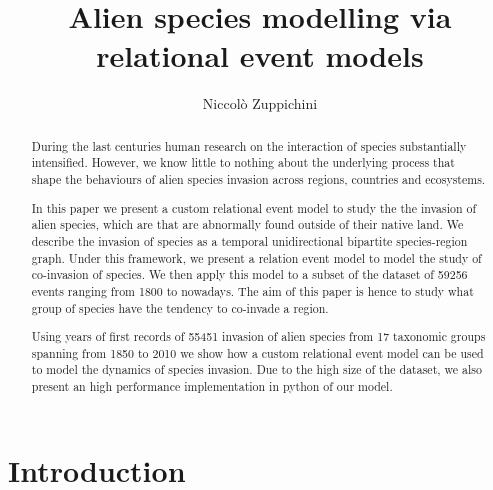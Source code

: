\documentclass[mscthesis]{usiinfthesis}
\title{Alien species modelling via relational event models} %
\author{Niccol\`o Zuppichini} %
\newcommand\numberevents{59256 }
\begin{document}
\maketitle %

\frontmatter %

\begin{abstract}
During the last centuries human research on the interaction of species substantially intensified. However, we know little to nothing about the underlying process that shape the behaviours of alien species invasion across regions, countries and ecosystems.

In this paper we present a custom relational event model to study the the invasion of alien species, which are that are abnormally found outside of their native land. We describe the invasion of species as a temporal unidirectional bipartite species-region graph. Under this framework, we present a relation event model to model the study of co-invasion of species. We then apply this model to a subset of the dataset of \numberevents events ranging from 1800 to nowadays. The aim of this paper is hence to study what group of species have the tendency to co-invade a region.

Using years of first records of 55451 invasion of alien species from 17 taxonomic groups spanning from 1850 to 2010 we show how a custom relational event model can be used to model the dynamics of species invasion. Due to the high size of the dataset, we also present an high performance implementation in python of our model.

\end{abstract}



\mainmatter

\chapter{Introduction}
\end{document}
